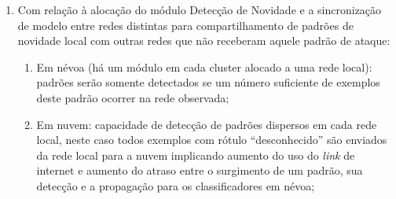 \begin{enumerate}
  
  \item Com relação à alocação do módulo Detecção de Novidade e a sincronização de
  modelo entre redes distintas para compartilhamento de padrões de novidade local
  com outras redes que não receberam aquele padrão de ataque:
  \begin{enumerate}
    
    \item Em névoa (há um módulo em cada cluster alocado a uma rede local):
    padrões serão somente detectados se um número suficiente de exemplos deste
    padrão
    ocorrer na rede observada;
    

    \item Em nuvem: capacidade de detecção de padrões dispersos em cada rede
    local,
    neste caso todos exemplos com rótulo ``desconhecido''  são enviados da rede
    local para a nuvem implicando aumento do uso do \emph{link} de internet e
    aumento do atraso entre o surgimento de um padrão, sua detecção e a propagação
    para os classificadores em névoa;


\end{enumerate}
\end{enumerate}
